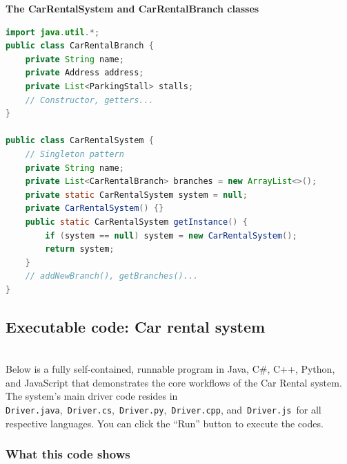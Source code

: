 \textbf{The CarRentalSystem and CarRentalBranch classes}

\begin{lstlisting}[language=Java]
import java.util.*;
public class CarRentalBranch {
    private String name;
    private Address address;
    private List<ParkingStall> stalls;
    // Constructor, getters...
}

public class CarRentalSystem {
    // Singleton pattern
    private String name;
    private List<CarRentalBranch> branches = new ArrayList<>();
    private static CarRentalSystem system = null;
    private CarRentalSystem() {}
    public static CarRentalSystem getInstance() {
        if (system == null) system = new CarRentalSystem();
        return system;
    }
    // addNewBranch(), getBranches()...
}
\end{lstlisting}

\subsection{Executable code: Car rental system}\label{iHEAK17Bi-MBtTIqSmTqj}
\\
Below is a fully self-contained, runnable program in Java, C\#, C++, Python, and JavaScript that demonstrates the core workflows of the Car Rental system. The system's main driver code resides in \texttt{Driver.java},~\texttt{Driver.cs},~\texttt{Driver.py},~\texttt{Driver.cpp}, and~\texttt{Driver.js}~for all respective languages. You can click the ``Run'' button to execute the codes.

\subsubsection{What this code shows}\label{umIWfwN0dGsL0XIZ2x5BG}

